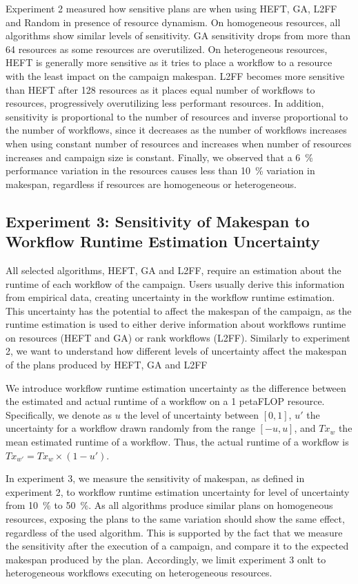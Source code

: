Experiment 2 measured how sensitive plans are when using HEFT, GA, L2FF and
Random in presence of resource dynamism. On homogeneous resources, all
algorithms show similar levels of sensitivity. GA sensitivity drops from more
than 64 resources as some resources are overutilized. On heterogeneous
resources, HEFT is generally more sensitive as it tries to place a workflow to a
resource with the least impact on the campaign makespan. L2FF becomes more
sensitive than HEFT after 128 resources as it places equal number of workflows
to resources, progressively overutilizing less performant resources. In
addition, sensitivity is proportional to the number of resources and inverse
proportional to the number of workflows, since it decreases as the number of
workflows increases when using constant number of resources and increases when
number of resources increases and campaign size is constant. Finally, we
observed that a 6~\% performance variation in the resources causes less than
10~\% variation in makespan, regardless if resources are homogeneous or
heterogeneous.

\subsection{Experiment 3: Sensitivity of Makespan to Workflow Runtime Estimation Uncertainty}
\label{ssec:work_uncert}
All selected algorithms, HEFT, GA and L2FF, require an estimation about the
runtime of each workflow of the campaign. Users usually derive this information
from empirical data, creating uncertainty in the workflow runtime estimation.
This uncertainty has the potential to affect the makespan of the campaign, as
the runtime estimation is used to either derive information about workflows
runtime on resources (HEFT and GA) or rank workflows (L2FF). Similarly to
experiment 2, we want to understand how different levels of uncertainty affect
the makespan of the plans produced by HEFT, GA and L2FF

We introduce workflow runtime estimation uncertainty as the difference between
the estimated and actual runtime of a workflow on a 1 petaFLOP resource.
Specifically, we denote as $u$ the level of uncertainty between $[0,1]$, $u'$
the uncertainty for a workflow drawn randomly from the range $[-u,u]$, and
$Tx_{w}$ the mean estimated runtime of a workflow. Thus, the actual runtime of
a workflow is $ Tx_{w'} = Tx_{w} \times (1-u')$.

In experiment 3, we measure the sensitivity of makespan, as defined in
experiment 2, to workflow runtime estimation uncertainty for level of
uncertainty from 10~\% to 50~\%. As all algorithms produce similar plans on
homogeneous resources, exposing the plans to the same variation should show the
same effect, regardless of the used algorithm. This is supported by the fact
that we measure the sensitivity after the execution of a campaign, and compare
it to the expected makespan produced by the plan. Accordingly, we limit
experiment 3 onlt to heterogeneous workflows executing on heterogeneous
resources.

